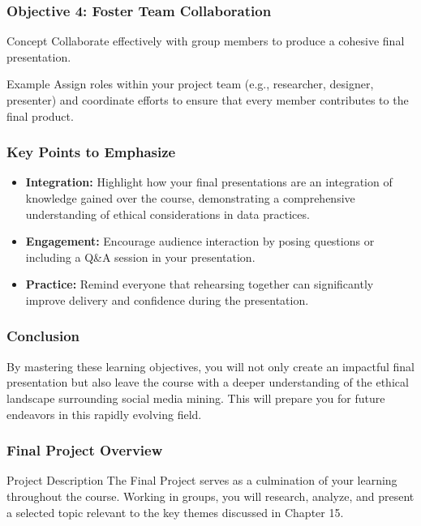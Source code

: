 \documentclass{beamer}
\begin{document}
\begin{frame}[fragile]
    \frametitle{Objective 4: Foster Team Collaboration}
    \begin{block}{Concept}
        Collaborate effectively with group members to produce a cohesive final presentation.
    \end{block}
    \begin{block}{Example}
        Assign roles within your project team (e.g., researcher, designer, presenter) and coordinate efforts to ensure that every member contributes to the final product.
    \end{block}
\end{frame}

\begin{frame}[fragile]
    \frametitle{Key Points to Emphasize}
    \begin{itemize}
        \item \textbf{Integration:} Highlight how your final presentations are an integration of knowledge gained over the course, demonstrating a comprehensive understanding of ethical considerations in data practices.
        \item \textbf{Engagement:} Encourage audience interaction by posing questions or including a Q\&A session in your presentation.
        \item \textbf{Practice:} Remind everyone that rehearsing together can significantly improve delivery and confidence during the presentation.
    \end{itemize}
\end{frame}

\begin{frame}[fragile]
    \frametitle{Conclusion}
    By mastering these learning objectives, you will not only create an impactful final presentation but also leave the course with a deeper understanding of the ethical landscape surrounding social media mining. This will prepare you for future endeavors in this rapidly evolving field.
\end{frame}

\begin{frame}[fragile]
    \frametitle{Final Project Overview}
    \begin{block}{Project Description}
        The Final Project serves as a culmination of your learning throughout the course. Working in groups, you will research, analyze, and present a selected topic relevant to the key themes discussed in Chapter 15. 
    \end{block}
\end{frame}
\end{document}
